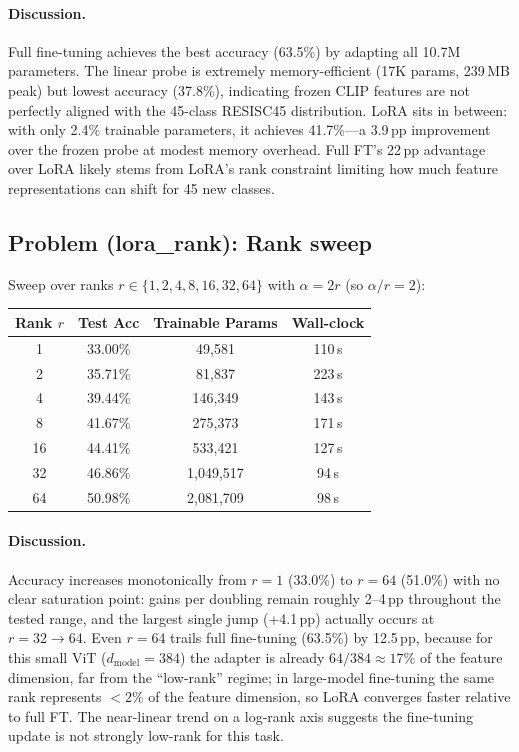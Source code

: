 \documentclass[11pt]{article}
\begin{document}
\paragraph{Discussion.}
Full fine-tuning achieves the best accuracy (63.5\%) by adapting all 10.7M parameters. The linear probe is extremely memory-efficient (17K params, 239\,MB peak) but lowest accuracy (37.8\%), indicating frozen CLIP features are not perfectly aligned with the 45-class RESISC45 distribution. LoRA sits in between: with only 2.4\% trainable parameters, it achieves 41.7\%---a 3.9\,pp improvement over the frozen probe at modest memory overhead. Full FT's 22\,pp advantage over LoRA likely stems from LoRA's rank constraint limiting how much feature representations can shift for 45 new classes.

\subsection*{Problem (lora\_rank): Rank sweep}

Sweep over ranks $r \in \{1, 2, 4, 8, 16, 32, 64\}$ with $\alpha = 2r$ (so $\alpha/r = 2$):

\begin{center}
\begin{tabular}{cccc}
\toprule
Rank $r$ & Test Acc & Trainable Params & Wall-clock \\
\midrule
1  & 33.00\% & 49{,}581 & 110\,s \\
2  & 35.71\% & 81{,}837 & 223\,s \\
4  & 39.44\% & 146{,}349 & 143\,s \\
8  & 41.67\% & 275{,}373 & 171\,s \\
16 & 44.41\% & 533{,}421 & 127\,s \\
32 & 46.86\% & 1{,}049{,}517 & 94\,s \\
64 & 50.98\% & 2{,}081{,}709 & 98\,s \\
\bottomrule
\end{tabular}
\end{center}

\paragraph{Discussion.}
Accuracy increases monotonically from $r{=}1$ (33.0\%) to $r{=}64$ (51.0\%) with no clear saturation point: gains per doubling remain roughly 2--4\,pp throughout the tested range, and the largest single jump (+4.1\,pp) actually occurs at $r{=}32 \to 64$. Even $r{=}64$ trails full fine-tuning (63.5\%) by 12.5\,pp, because for this small ViT ($d_{\mathrm{model}}{=}384$) the adapter is already $64/384 \approx 17\%$ of the feature dimension, far from the ``low-rank'' regime; in large-model fine-tuning the same rank represents $<2\%$ of the feature dimension, so LoRA converges faster relative to full FT. The near-linear trend on a log-rank axis suggests the fine-tuning update is not strongly low-rank for this task.
\end{document}
